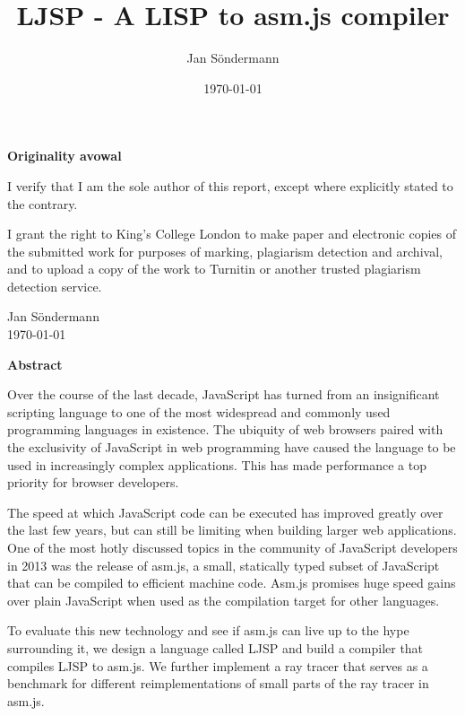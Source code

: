 \documentclass[11pt]{report}
\title{LJSP - A LISP to asm.js compiler}
\author{Jan S\"ondermann}
\date{\today}
\begin{document}


\maketitle

\begin{center}
\textbf{Originality avowal}
\end{center}

I verify that I am the sole author of this report, except where explicitly stated to the contrary.

I grant the right to King's College London to make paper and electronic copies of the submitted work for purposes of marking, plagiarism detection and archival, and to upload a copy of the work to Turnitin or another trusted plagiarism detection service.\\

\begin{flushright}
Jan Söndermann \\
\today
\end{flushright}
\newpage
			
\begin{center}
\textbf{Abstract}
\end{center}
Over the course of the last decade, JavaScript has turned from an insignificant scripting language to one of the most widespread and commonly used programming languages in existence. The ubiquity of web browsers paired with the exclusivity of JavaScript in web programming have caused the language to be used in increasingly complex applications. This has made performance a top priority for browser developers.

The speed at which JavaScript code can be executed has improved greatly over the last few years, but can still be limiting when building larger web applications. One of the most hotly discussed topics in the community of JavaScript developers in 2013 was the release of asm.js, a small, statically typed subset of JavaScript that can be compiled to efficient machine code. Asm.js promises huge speed gains over plain JavaScript when used as the compilation target for other languages.

To evaluate this new technology and see if asm.js can live up to the hype surrounding it, we design a language called LJSP and build a compiler that compiles LJSP to asm.js. We further implement a ray tracer that serves as a benchmark for different reimplementations of small parts of the ray tracer in asm.js.
\end{document}
